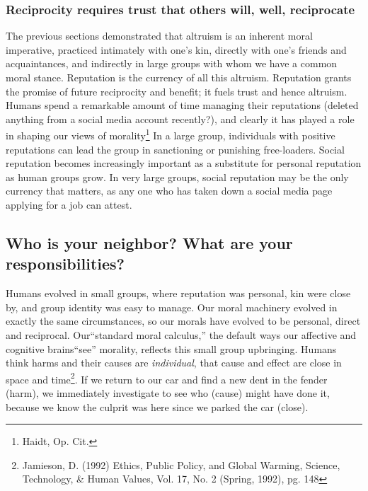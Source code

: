 \documentclass[amstex,12pt]{book}
\begin{document}
\subsubsection{Reciprocity requires trust that others will, well, reciprocate}
The previous sections demonstrated that altruism is an inherent moral imperative, practiced intimately with one's kin, directly with one's friends and acquaintances, and indirectly in large groups with whom we have a common moral stance. Reputation is the currency of all this altruism. Reputation grants the promise of future reciprocity and benefit; it fuels trust and hence altruism. Humans spend a remarkable amount of time managing their reputations (deleted anything from a social media account recently?), and clearly it has played a role in shaping our views of morality\footnote{Haidt, Op. Cit.} In a large group, individuals with positive reputations can lead the group in sanctioning or punishing free-loaders. Social reputation becomes increasingly important as a substitute for personal reputation as human groups grow. In very large groups, social reputation may be the only currency that matters, as any one who has taken down a social media page applying for a job can attest.

\subsection{Who is your neighbor? What are your responsibilities?}
Humans evolved in small groups, where reputation was personal, kin were close by, and group identity was easy to manage. Our moral machinery evolved in exactly the same circumstances, so our morals have evolved to be personal, direct and reciprocal. Our``standard moral calculus,'' the default ways our affective and cognitive brains``see'' morality, reflects this small group upbringing. Humans think harms and their causes are \emph{individual}, that cause and effect are close in space and time\footnote{Jamieson, D. (1992) Ethics, Public Policy, and Global Warming, Science, Technology, \& Human Values, Vol. 17, No. 2 (Spring, 1992), pg. 148}. If we return to our car and find a new dent in the fender (harm), we immediately investigate to see who (cause) might have done it, because we know the culprit was here since we parked the car (close).\\
\end{document}
